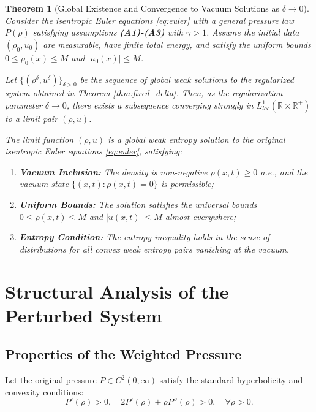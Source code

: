 \documentclass[12pt, reqno]{article}
\newtheorem{theorem}{Theorem}[section]
\theoremstyle{definition}
\numberwithin{equation}{section}
\begin{document}
\begin{theorem}[Global Existence and Convergence to Vacuum Solutions as $\delta \to 0$]
\label{thm:vanishing_delta}
Consider the isentropic Euler equations \eqref{eq:euler} with a general pressure law $P(\rho)$ satisfying assumptions \textbf{(A1)-(A3)} with $\gamma > 1$.
Assume the initial data $(\rho_0, u_0)$ are measurable, have finite total energy, and satisfy the uniform bounds $0 \le \rho_0(x) \le M$ and $|u_0(x)| \le M$.

Let $\{(\rho^\delta, u^\delta)\}_{\delta > 0}$ be the sequence of global weak solutions to the regularized system obtained in Theorem \ref{thm:fixed_delta}.
Then, as the regularization parameter $\delta \to 0$, there exists a subsequence converging strongly in $L^1_{loc}(\mathbb{R} \times \mathbb{R}^+)$ to a limit pair $(\rho, u)$.

The limit function $(\rho, u)$ is a global weak entropy solution to the original isentropic Euler equations \eqref{eq:euler}, satisfying:
\begin{enumerate}
    \item \textbf{Vacuum Inclusion:} The density is non-negative $\rho(x,t) \ge 0$ a.e., and the vacuum state $\{ (x,t) : \rho(x,t) = 0 \}$ is permissible;
    \item \textbf{Uniform Bounds:} The solution satisfies the universal bounds $0 \le \rho(x,t) \le M$ and $|u(x,t)| \le M$ almost everywhere;
    \item \textbf{Entropy Condition:} The entropy inequality holds in the sense of distributions for all convex weak entropy pairs vanishing at the vacuum.
\end{enumerate}
\end{theorem}



\section{Structural Analysis of the Perturbed System}
\label{sec:structure}

\subsection{Properties of the Weighted Pressure}
Let the original pressure $P \in C^2(0,\infty)$ satisfy the standard hyperbolicity and convexity conditions:
\begin{equation} \label{eq:pressure_assumptions}
    P'(\rho) > 0, \quad 2P'(\rho) + \rho P''(\rho) > 0, \quad \forall \rho > 0.
\end{equation}
\end{document}
